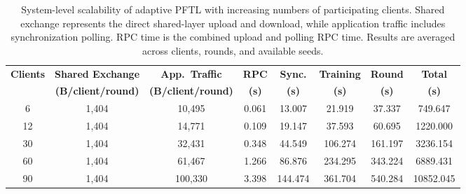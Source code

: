 \begin{table}[!t]
\centering
\small
\caption{System-level scalability of adaptive PFTL with increasing numbers of participating clients. Shared exchange represents the direct shared-layer upload and download, while application traffic includes synchronization polling. RPC time is the combined upload and polling RPC time. Results are averaged across clients, rounds, and available seeds.}
\label{tab:system_scalability}
\setlength{\tabcolsep}{3.5pt}
\begin{tabular}{cccccccc}
\toprule
\textbf{Clients}
& \textbf{Shared Exchange}
& \textbf{App.\ Traffic}
& \textbf{RPC}
& \textbf{Sync.}
& \textbf{Training}
& \textbf{Round}
& \textbf{Total} \\

& \textbf{(B/client/round)}
& \textbf{(B/client/round)}
& \textbf{(s)}
& \textbf{(s)}
& \textbf{(s)}
& \textbf{(s)}
& \textbf{(s)} \\
\midrule
6 & 1,404 & 10,495 & 0.061 & 13.007 & 21.919 & 37.337 & 749.647 \\
12 & 1,404 & 14,771 & 0.109 & 19.147 & 37.593 & 60.695 & 1220.000 \\
30 & 1,404 & 32,431 & 0.348 & 44.549 & 106.274 & 161.197 & 3236.154 \\
60 & 1,404 & 61,467 & 1.266 & 86.876 & 234.295 & 343.224 & 6889.431 \\
90 & 1,404 & 100,330 & 3.398 & 144.474 & 361.704 & 540.284 & 10852.045 \\
\bottomrule
\end{tabular}
\end{table}
